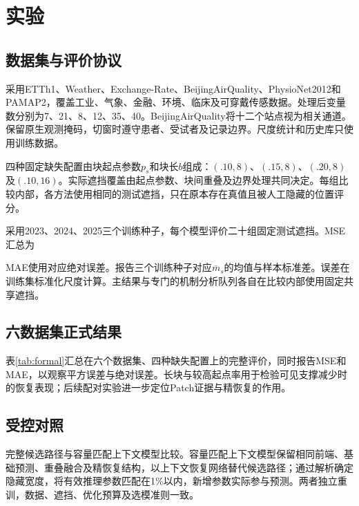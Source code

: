 \section{实验}\label{sec:experiments}
\subsection{数据集与评价协议}
采用ETTh1、Weather、Exchange-Rate、BeijingAirQuality、PhysioNet2012和PAMAP2，覆盖工业、气象、金融、环境、临床及可穿戴传感数据。处理后变量数分别为7、21、8、12、35、40。BeijingAirQuality将十二个站点视为相关通道。保留原生观测掩码，切窗时遵守患者、受试者及记录边界。尺度统计和历史库只使用训练数据。

四种固定缺失配置由块起点参数$p_s$和块长$b$组成：$(.10,8)$、$(.15,8)$、$(.20,8)$及$(.10,16)$。实际遮挡覆盖由起点参数、块间重叠及边界处理共同决定。每组比较内部，各方法使用相同的测试遮挡，只在原本存在真值且被人工隐藏的位置评分。

采用2023、2024、2025三个训练种子，每个模型评价二十组固定测试遮挡。MSE汇总为

MAE使用对应绝对误差。报告三个训练种子对应$\overline m_s$的均值与样本标准差。误差在训练集标准化尺度计算。主结果与专门的机制分析队列各自在比较内部使用固定共享遮挡。

\subsection{六数据集正式结果}
表\ref{tab:formal}汇总\Model{}在六个数据集、四种缺失配置上的完整评价，同时报告MSE和MAE，以观察平方误差与绝对误差。长块与较高起点率用于检验可见支撑减少时的恢复表现；后续配对实验进一步定位Patch证据与精恢复的作用。

\begin{table}[t]
 \centering\small\setlength{\tabcolsep}{5pt}
 
 \caption{六数据集正式\Model{}结果。每个模型先平均二十组共享测试遮挡，再汇总三个训练种子的均值$\pm$样本标准差。$p_s$为块起点参数，$b$为块长；本表覆盖全部配置的\Model{}实测值。}
 \label{tab:formal}
\end{table}

\subsection{受控对照}
完整候选路径与容量匹配上下文模型比较。容量匹配上下文模型保留相同前端、基础预测、重叠融合及精恢复结构，以上下文恢复网络替代候选路径；通过解析确定隐藏宽度，将有效推理参数匹配在1\%以内，新增参数实际参与预测。两者独立重训，数据、遮挡、优化预算及选模准则一致。

